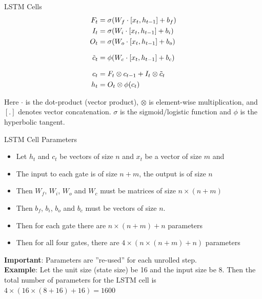 \documentclass[ignorenonframetext,xcolor=x11names]{beamer}
\begin{document}
\begin{frame}[label=full]{LSTM Cells}
\begin{align*}
F_t &= \sigma (W_f \cdot [ x_t, h_{t-1}] + b_f) \\
I_t &= \sigma (W_i \cdot [ x_t, h_{t-1}] + b_i) \\
O_t &= \sigma (W_o \cdot [ x_t, h_{t-1}] + b_o) \\[.5\baselineskip]
\tilde{c}_t &= \phi (W_c \cdot [ x_t, h_{t-1}] + b_c) \\[.5\baselineskip]
c_t &= F_t \otimes c_{t-1} + I_t \otimes \tilde{c}_t \\
h_t &= O_t \otimes \phi(c_t) 
\end{align*}

\small
Here $\cdot$ is the dot-product (vector product), $\otimes$ is element-wise multiplication, and $[.]$ denotes vector concatenation. $\sigma$ is the sigmoid/logistic function and $\phi$ is the hyperbolic tangent.
\end{frame}

\begin{frame}[label=full]{LSTM Cell Parameters}
\small
\begin{itemize}
  \item Let $h_t$ and $c_t$ be vectors of size $n$ and $x_t$ be a vector of size $m$ and 
  \item The input to each gate is of size $n+m$, the output is of size $n$
  \item Then $W_f$, $W_i$, $W_o$ and $W_c$ must be matrices of size $n \times (n+m)$
  \item Then $b_f$, $b_i$, $b_o$ and $b_c$ must be vectors of size $n$. 
  \item Then for each gate there are $n \times (n+m) + n$ parameters
  \item Then for all four gates, there are $4 \times (n \times (n+m) + n)$ parameters
\end{itemize}
\textbf{Important}: Parameters are ''re-used'' for each unrolled step.\\

\textbf{Example}: Let the unit size (state size) be 16 and the input size be 8. Then the total number of parameters for the LSTM cell is $4 \times (16 \times (8+16) + 16) = 1600$
\end{frame}
\end{document}
